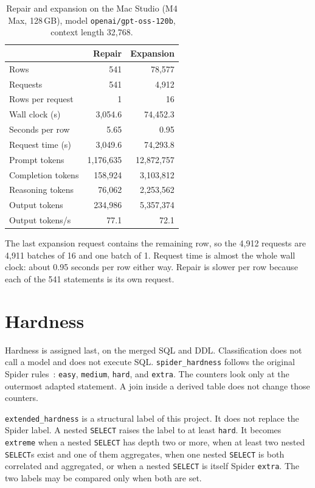 \documentclass[11pt,a4paper]{article}
\begin{document}
\begin{table}[ht]
  \centering
  \caption{Repair and expansion on the Mac Studio (M4 Max, 128\,GB),
  model \texttt{openai/gpt-oss-120b}, context length 32{,}768.}
  \label{tab:runs}
  \begin{tabular}{lrr}
    \toprule
     & Repair & Expansion \\
    \midrule
    Rows              &       541 &     78{,}577 \\
    Requests          &       541 &      4{,}912 \\
    Rows per request  &         1 &           16 \\
    Wall clock (s)    &   3{,}054.6 & 74{,}452.3 \\
    Seconds per row   &      5.65 &       0.95 \\
    Request time (s)  &   3{,}049.6 & 74{,}293.8 \\
    Prompt tokens     & 1{,}176{,}635 & 12{,}872{,}757 \\
    Completion tokens &   158{,}924 &  3{,}103{,}812 \\
    Reasoning tokens  &    76{,}062 &  2{,}253{,}562 \\
    Output tokens     &   234{,}986 &  5{,}357{,}374 \\
    Output tokens/s   &      77.1 &       72.1 \\
    \bottomrule
  \end{tabular}
\end{table}

The last expansion request contains the remaining row, so the 4{,}912 requests
are 4{,}911 batches of 16 and one batch of 1. Request time is almost the whole
wall clock: about 0.95 seconds per row either way. Repair is slower per row
because each of the 541 statements is its own request.

\section{Hardness}

Hardness is assigned last, on the merged SQL and DDL. Classification does not
call a model and does not execute SQL. \texttt{spider\_hardness} follows the
original Spider rules~\cite{yu2018spider}: \texttt{easy}, \texttt{medium},
\texttt{hard}, and \texttt{extra}. The counters look only at the outermost
adapted statement. A join inside a derived table does not change those
counters.

\texttt{extended\_hardness} is a structural label of this project. It does not
replace the Spider label. A nested \texttt{SELECT} raises the label to at
least \texttt{hard}. It becomes \texttt{extreme} when a nested \texttt{SELECT}
has depth two or more, when at least two nested \texttt{SELECT}s exist and one
of them aggregates, when one nested \texttt{SELECT} is both correlated and
aggregated, or when a nested \texttt{SELECT} is itself Spider \texttt{extra}.
The two labels may be compared only when both are set.
\end{document}
